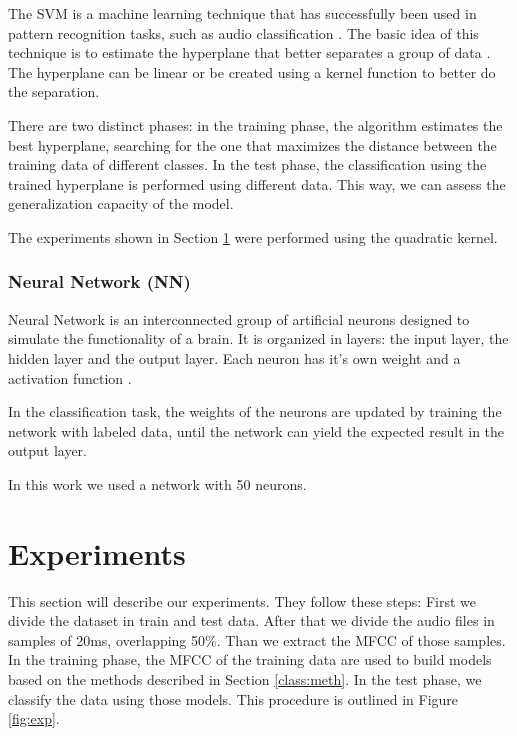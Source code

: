 \documentclass[12pt]{article}
\begin{document}
The SVM is a machine learning technique that has successfully been used in pattern recognition tasks, such as audio classification \cite{dhanalakshmi2009classification}. The basic idea of this technique is to estimate the hyperplane that better separates a group of data \cite{cumani2012analysis}. The hyperplane can be linear or be created using a kernel function to better do the separation.

There are two distinct phases: in the training phase, the algorithm estimates the best hyperplane, searching for the one that maximizes the distance between the training data of different classes. In the test phase, the classification using the trained hyperplane is performed using different data. This way, we can assess the generalization capacity of the model.

The experiments shown in Section \ref{exp} were performed using the quadratic kernel.%


\subsubsection{Neural Network (NN)} \label{class:nn}


Neural Network is an interconnected group of artificial neurons designed to simulate the functionality of a brain. It is organized in layers: the input layer, the hidden layer and the output layer. Each neuron has it's own weight and a activation function \cite{wu2007leaf}. 

In the classification task, the weights of the neurons are updated by training the network with labeled data, until the network can yield the expected result in the output layer.

In this work we used a network with 50 neurons.%


\section{Experiments} \label{exp}

This section will describe our experiments. They follow these steps: First we divide the dataset in train and test data. After that we divide the audio files in samples of 20ms, overlapping 50\%. Than we extract the MFCC of those samples. In the training phase, the MFCC of the training data are used to build models based on the methods described in Section \ref{class:meth}. In the test phase, we classify the data using those models. This procedure is outlined in Figure \ref{fig:exp}.
\end{document}
